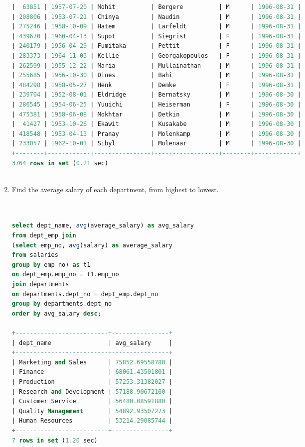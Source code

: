 \documentclass[12pt]{article}
\begin{document}
\begin{enumerate}
\begin{lstlisting}[language=SQL]
|  63851 | 1957-07-20 | Mohit          | Bergere          | M      | 1996-08-31 |
| 208806 | 1953-07-21 | Chinya         | Naudin           | M      | 1996-08-31 |
| 275246 | 1958-10-09 | Hatem          | Larfeldt         | M      | 1996-08-31 |
| 439670 | 1960-04-13 | Supot          | Siegrist         | F      | 1996-08-31 |
| 240179 | 1956-04-29 | Fumitaka       | Pettit           | F      | 1996-08-31 |
| 283373 | 1964-11-03 | Kellie         | Georgakopoulos   | F      | 1996-08-31 |
| 262599 | 1955-12-22 | Maria          | Mullainathan     | M      | 1996-08-31 |
| 255685 | 1956-10-30 | Dines          | Bahi             | M      | 1996-08-31 |
| 484298 | 1958-05-27 | Henk           | Demke            | F      | 1996-08-31 |
| 239704 | 1952-08-01 | Eldridge       | Bernatsky        | M      | 1996-08-30 |
| 286545 | 1954-06-25 | Yuuichi        | Heiserman        | F      | 1996-08-30 |
| 475381 | 1958-06-08 | Mokhtar        | Detkin           | M      | 1996-08-30 |
|  41427 | 1953-10-26 | Ekawit         | Kusakabe         | M      | 1996-08-30 |
| 418548 | 1953-04-13 | Pranay         | Molenkamp        | M      | 1996-08-30 |
| 233057 | 1962-10-01 | Sibyl          | Molenaar         | M      | 1996-08-30 |
+--------+------------+----------------+------------------+--------+------------+
3764 rows in set (0.21 sec)



\end{lstlisting}


\item Find the average salary of each department, from highest to lowest.

\begin{lstlisting}[language=SQL]


select dept_name, avg(average_salary) as avg_salary
from dept_emp join
(select emp_no, avg(salary) as average_salary
from salaries 
group by emp_no) as t1
on dept_emp.emp_no = t1.emp_no
join departments
on departments.dept_no = dept_emp.dept_no
group by departments.dept_no
order by avg_salary desc;

+--------------------------+----------------+
| dept_name                | avg_salary     |
+--------------------------+----------------+
| Marketing and Sales      | 75852.69558780 |
| Finance                  | 68061.43501801 |
| Production               | 57253.31382027 |
| Research and Development | 57188.90672100 |
| Customer Service         | 56480.08591880 |
| Quality Management       | 54892.93507273 |
| Human Resources          | 53214.29085744 |
+--------------------------+----------------+
7 rows in set (1.20 sec)


\end{lstlisting}
\end{enumerate}
\end{document}
